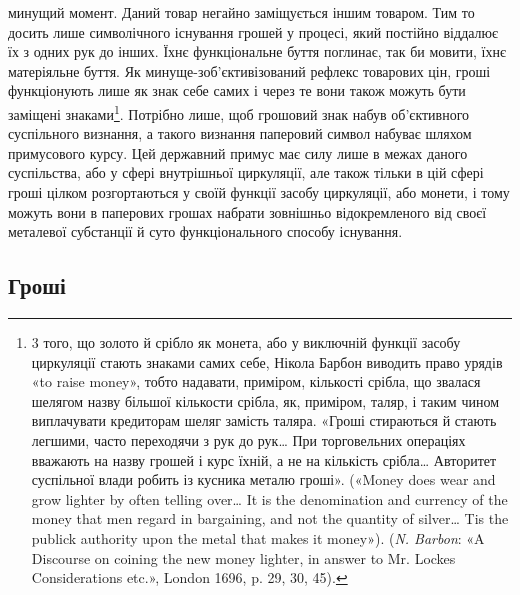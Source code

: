 \parcont{}  %
минущий момент. Даний товар негайно заміщується іншим товаром.
Тим то досить лише символічного існування грошей у процесі,
який постійно віддалює їх з одних рук до інших. Їхнє функціональне
буття поглинає, так би мовити, їхнє матеріяльне буття.
Як минуще-зоб’єктивізований рефлекс товарових цін, гроші
функціонують лише як знак себе самих і через те вони також
можуть бути заміщені знаками\footnote{
3 того, що золото й срібло як монета, або у виключній функції
засобу циркуляції стають знаками самих себе, Нікола Барбон виводить
право урядів «to raise money», тобто надавати, приміром, кількості срібла,
що звалася шелягом назву більшої кількости срібла, як, приміром, таляр,
і таким чином виплачувати кредиторам шеляг замість таляра. «Гроші
стираються й стають легшими, часто переходячи з рук до рук\dots{} При торговельних
операціях вважають на назву грошей і курс їхній, а не на кількість
срібла\dots{} Авторитет суспільної влади робить із кусника металю
гроші». («Money does wear and grow lighter by often telling over\dots{} It is
the denomination and currency of the money that men regard in bargaining,
and not the quantity of silver\dots{} Tis the publick authority upon the metal
that makes it money»). (\emph{N. Barbon}: «A Discourse on coining the new
money lighter, in answer to Mr. Lockes Considerations etc.», London 1696,
p. 29, 30, 45).
}. Потрібно лише, щоб грошовий
знак набув об’єктивного суспільного визнання, а такого визнання
паперовий символ набуває шляхом примусового курсу. Цей
державний примус має силу лише в межах даного суспільства,
або у сфері внутрішньої циркуляції, але також тільки в цій
сфері гроші цілком розгортаються у своїй функції засобу циркуляції,
або монети, і тому можуть вони в паперових грошах набрати
зовнішньо відокремленого від своєї металевої субстанції й суто
функціонального способу існування.

\subsection{Гроші}

